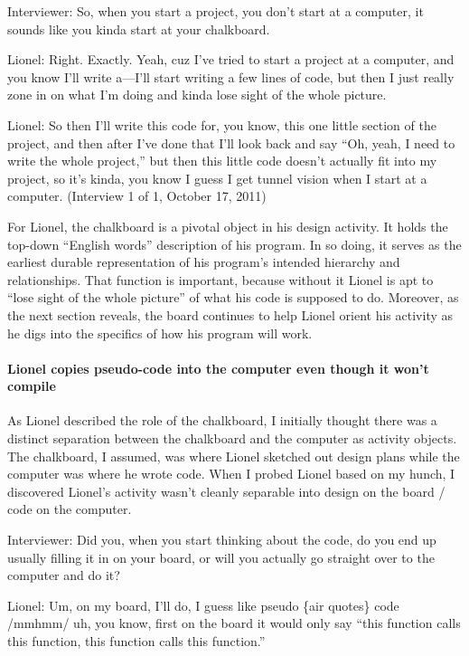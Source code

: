Interviewer: So, when you start a project, you don't start at a
computer, it sounds like you kinda start at your chalkboard.

Lionel: Right. Exactly. Yeah, cuz I've tried to start a project at a
computer, and you know I'll write a---I'll start writing a few lines of
code, but then I just really zone in on what I'm doing and kinda lose
sight of the whole picture.

Lionel: So then I'll write this code for, you know, this one little
section of the project, and then after I've done that I'll look back and
say ``Oh, yeah, I need to write the whole project,'' but then this
little code doesn't actually fit into my project, so it's kinda, you
know I guess I get tunnel vision when I start at a computer. (Interview
1 of 1, October 17, 2011)

For Lionel, the chalkboard is a pivotal object in his design activity.
It holds the top-down ``English words'' description of his program. In
so doing, it serves as the earliest durable representation of his
program's intended hierarchy and relationships. That function is
important, because without it Lionel is apt to ``lose sight of the whole
picture'' of what his code is supposed to do. Moreover, as the next
section reveals, the board continues to help Lionel orient his activity
as he digs into the specifics of how his program will work.

\paragraph{Lionel copies pseudo-code into the computer even though it
won't
compile}\label{lionel-copies-pseudo-code-into-the-computer-even-though-it-wont-compile}

As Lionel described the role of the chalkboard, I initially thought
there was a distinct separation between the chalkboard and the computer
as activity objects. The chalkboard, I assumed, was where Lionel
sketched out design plans while the computer was where he wrote code.
When I probed Lionel based on my hunch, I discovered Lionel's activity
wasn't cleanly separable into design on the board / code on the
computer.

Interviewer: Did you, when you start thinking about the code, do you end
up usually filling it in on your board, or will you actually go straight
over to the computer and do it?

Lionel: Um, on my board, I'll do, I guess like
\textbar{}\textbar{}pseudo\textbar{}\textbar{} \textbar{}\{air
quotes\}\textbar{} code /mmhmm/ uh, you know, first on the board it
would only say ``this function calls this function, this function calls
this function.''


